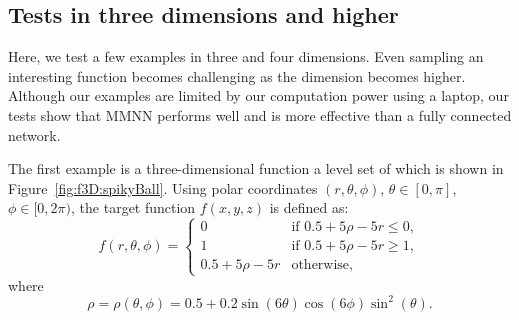 \documentclass[review,hidelinks,onefignum,onetabnum]{siamart250211}
\begin{document}
\subsection{Tests in three dimensions and higher}\label{sec:higher}
Here,
we test a few examples in three and four dimensions. Even sampling an interesting function becomes challenging as the dimension becomes higher. Although our examples are limited by our computation power using a laptop, our tests show that MMNN performs well and is more effective than a fully connected network. 

The first example is a three-dimensional function a level set of which is shown in Figure~\ref{fig:f3D:spikyBall}. Using polar coordinates \((r, \theta, \phi)\), $\theta \in [0,\pi]$, $\phi\in[0,2\pi)$,
the target function \( f(x, y, z) \) is defined as:
\begin{equation*}
    f(r, \theta, \phi) = \begin{cases}
        0 & \text{if } 0.5 + 5\rho - 5r \leq 0, \\
        1 & \text{if } 0.5 + 5\rho - 5r \geq 1, \\
        0.5 + 5\rho - 5r & \text{otherwise},
    \end{cases}
\end{equation*}
where
\begin{equation*}
    \rho=\rho(\theta,\phi)=0.5+0.2\sin(6  \theta)\cos(6 \phi)\sin^2(\theta).
\end{equation*}
\end{document}
